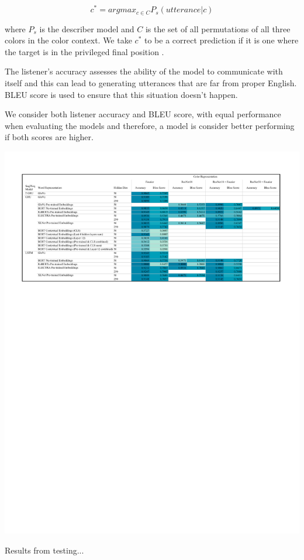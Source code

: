 \[c^{*} = argmax_{c \in C} P_{s} (utterance | c)\]

\par
where \(P_{s}\) is the describer model and \(C\) is the set of all permutations of all three colors in the color context. We take \(c^{*}\) to be a correct prediction if it is one where the target is in the privileged final position \citep{potts-2020-colors}.

\par
The listener's accuracy assesses the ability of the model to communicate with itself and this can lead to generating utterances that are far from proper English. BLEU score is used to ensure that this situation doesn’t happen.

\par
We consider both listener accuracy and BLEU score, with equal performance when evaluating the models and therefore, a model is consider better performing if both scores are higher.

\begin{table}[ht]
\centering
\includegraphics[width=\textwidth]{assets/heatmap.pdf}
\caption[Heatmap]{Results from testing...}
\label{table:heatmap}
\end{table}


